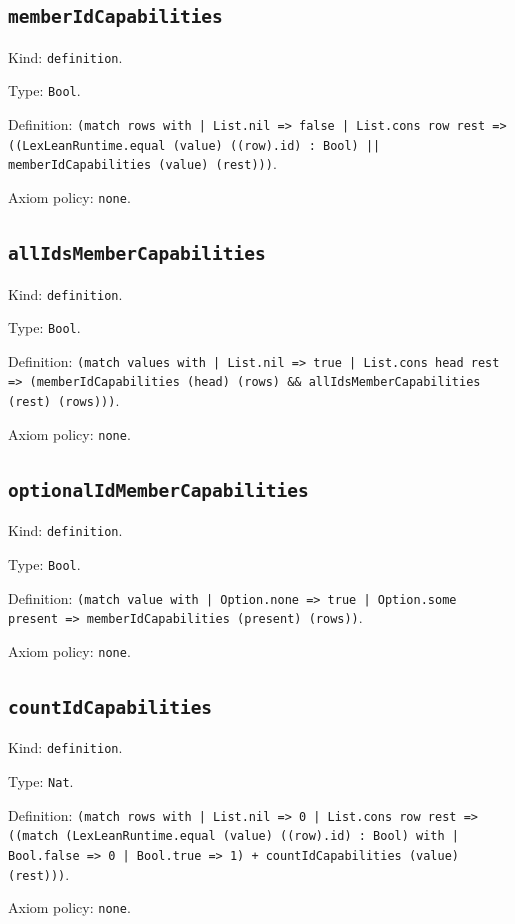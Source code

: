 \documentclass[11pt]{article}
\begin{document}
\subsection*{\texttt{memberIdCapabilities}}
\noindent Kind: \texttt{definition}.\par
\noindent Type: \texttt{Bool}.\par
\noindent Definition: \texttt{(match rows with | List.nil => false | List.cons row rest => ((LexLeanRuntime.equal (value) ((row).id) : Bool) || memberIdCapabilities (value) (rest)))}.\par
\noindent Axiom policy: \texttt{none}.\par
\subsection*{\texttt{allIdsMemberCapabilities}}
\noindent Kind: \texttt{definition}.\par
\noindent Type: \texttt{Bool}.\par
\noindent Definition: \texttt{(match values with | List.nil => true | List.cons head rest => (memberIdCapabilities (head) (rows) \&\& allIdsMemberCapabilities (rest) (rows)))}.\par
\noindent Axiom policy: \texttt{none}.\par
\subsection*{\texttt{optionalIdMemberCapabilities}}
\noindent Kind: \texttt{definition}.\par
\noindent Type: \texttt{Bool}.\par
\noindent Definition: \texttt{(match value with | Option.none => true | Option.some present => memberIdCapabilities (present) (rows))}.\par
\noindent Axiom policy: \texttt{none}.\par
\subsection*{\texttt{countIdCapabilities}}
\noindent Kind: \texttt{definition}.\par
\noindent Type: \texttt{Nat}.\par
\noindent Definition: \texttt{(match rows with | List.nil => 0 | List.cons row rest => ((match (LexLeanRuntime.equal (value) ((row).id) : Bool) with | Bool.false => 0 | Bool.true => 1) + countIdCapabilities (value) (rest)))}.\par
\noindent Axiom policy: \texttt{none}.\par
\end{document}
